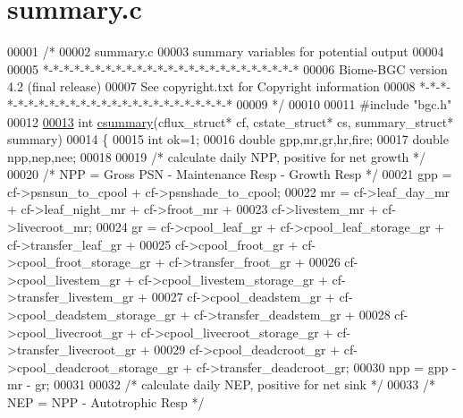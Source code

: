 \hypertarget{summary_8c_source}{}\section{summary.\+c}
\label{summary_8c_source}

\begin{DoxyCode}
00001 \textcolor{comment}{/* }
00002 \textcolor{comment}{summary.c}
00003 \textcolor{comment}{summary variables for potential output}
00004 \textcolor{comment}{}
00005 \textcolor{comment}{*-*-*-*-*-*-*-*-*-*-*-*-*-*-*-*-*-*-*-*-*-*-*-*-*}
00006 \textcolor{comment}{Biome-BGC version 4.2 (final release)}
00007 \textcolor{comment}{See copyright.txt for Copyright information}
00008 \textcolor{comment}{*-*-*-*-*-*-*-*-*-*-*-*-*-*-*-*-*-*-*-*-*-*-*-*-*}
00009 \textcolor{comment}{*/}
00010 
00011 \textcolor{preprocessor}{#include "bgc.h"}
00012 
\hypertarget{summary_8c_source_l00013}{}\hyperlink{summary_8c_a063a448b14734e59d301b2639c5b107a}{00013} \textcolor{keywordtype}{int} \hyperlink{summary_8c_a063a448b14734e59d301b2639c5b107a}{csummary}(cflux\_struct* cf, cstate\_struct* cs, summary\_struct* summary)
00014 \{
00015     \textcolor{keywordtype}{int} ok=1;
00016     \textcolor{keywordtype}{double} gpp,mr,gr,hr,fire;
00017     \textcolor{keywordtype}{double} npp,nep,nee;
00018     
00019     \textcolor{comment}{/* calculate daily NPP, positive for net growth */}
00020     \textcolor{comment}{/* NPP = Gross PSN - Maintenance Resp - Growth Resp */}
00021     gpp = cf->psnsun\_to\_cpool + cf->psnshade\_to\_cpool;
00022     mr = cf->leaf\_day\_mr + cf->leaf\_night\_mr + cf->froot\_mr + 
00023         cf->livestem\_mr + cf->livecroot\_mr;
00024     gr = cf->cpool\_leaf\_gr + cf->cpool\_leaf\_storage\_gr + cf->transfer\_leaf\_gr +
00025         cf->cpool\_froot\_gr + cf->cpool\_froot\_storage\_gr + cf->transfer\_froot\_gr + 
00026         cf->cpool\_livestem\_gr + cf->cpool\_livestem\_storage\_gr + cf->transfer\_livestem\_gr +
00027         cf->cpool\_deadstem\_gr + cf->cpool\_deadstem\_storage\_gr + cf->transfer\_deadstem\_gr + 
00028         cf->cpool\_livecroot\_gr + cf->cpool\_livecroot\_storage\_gr + cf->transfer\_livecroot\_gr + 
00029         cf->cpool\_deadcroot\_gr + cf->cpool\_deadcroot\_storage\_gr + cf->transfer\_deadcroot\_gr;
00030     npp = gpp - mr - gr;
00031     
00032     \textcolor{comment}{/* calculate daily NEP, positive for net sink */}
00033     \textcolor{comment}{/* NEP = NPP - Autotrophic Resp */}

\end{DoxyCode}
